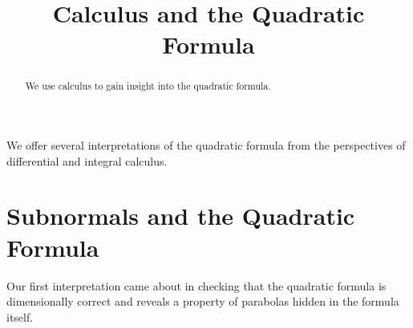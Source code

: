 \documentclass{ximera}
\title{Calculus and the Quadratic Formula}
\begin{document}
\begin{abstract}
We use calculus to gain insight into the quadratic formula.
\end{abstract}
\maketitle

 We offer several interpretations of the quadratic formula from the perspectives of differential and integral calculus.

\section*{Subnormals and the Quadratic Formula}
Our first interpretation came about in checking that the quadratic formula is dimensionally correct and reveals a property of parabolas hidden in the formula itself.


 
 
 
\end{document}
